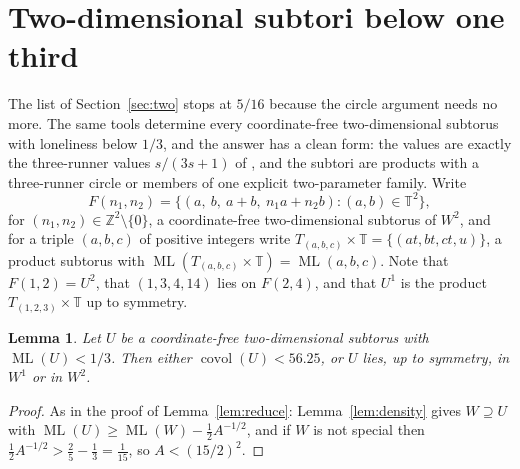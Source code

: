 \documentclass[12pt]{amsart}
\newtheorem{lemma}[theorem]{Lemma}
\theoremstyle{definition}\newtheorem{definition}[theorem]{Definition}
\theoremstyle{remark}\newtheorem{remark}[theorem]{Remark}
\newcommand{\Z}{\mathbb Z}\newcommand{\R}{\mathbb R}\newcommand{\T}{\mathbb T}
\newcommand{\ML}{\operatorname{ML}}
\newcommand{\covol}{\operatorname{covol}}
\newcommand{\Uone}{U^{1}}\newcommand{\Utwo}{U^{2}}
\newcommand{\Wone}{W^{1}}\newcommand{\Wtwo}{W^{2}}
\begin{document}
\section{Two-dimensional subtori below one third}\label{sec:second}
The list of Section~\ref{sec:two} stops at $5/16$ because the circle argument needs no more. The same tools determine every coordinate-free two-dimensional subtorus with loneliness below $1/3$, and the answer has a clean form: the values are exactly the three-runner values $s/(3s+1)$ of \cite[Theorems~5.1 and 7.2]{Kravitz}, and the subtori are products with a three-runner circle or members of one explicit two-parameter family. Write
\[
 F(n_1,n_2)=\{(a,\ b,\ a+b,\ n_1a+n_2b):(a,b)\in\T^2\},
\]
for $(n_1,n_2)\in\Z^2\setminus\{0\}$, a coordinate-free two-dimensional subtorus of $\Wtwo$, and for a triple $(a,b,c)$ of positive integers write $T_{(a,b,c)}\times\T=\{(at,bt,ct,u)\}$, a product subtorus with $\ML(T_{(a,b,c)}\times\T)=\ML(a,b,c)$. Note that $F(1,2)=\Utwo$, that $(1,3,4,14)$ lies on $F(2,4)$, and that $\Uone$ is the product $T_{(1,2,3)}\times\T$ up to symmetry.

\begin{lemma}\label{lem:third-reduce}
Let $U$ be a coordinate-free two-dimensional subtorus with $\ML(U)<1/3$. Then either $\covol(U)<56.25$, or $U$ lies, up to symmetry, in $\Wone$ or in $\Wtwo$.
\end{lemma}
\begin{proof}
As in the proof of Lemma~\ref{lem:reduce}: Lemma~\ref{lem:density} gives $W\supseteq U$ with $\ML(U)\ge\ML(W)-\frac12A^{-1/2}$, and if $W$ is not special then $\frac12A^{-1/2}>\frac25-\frac13=\frac1{15}$, so $A<(15/2)^2$.
\end{proof}
\end{document}
